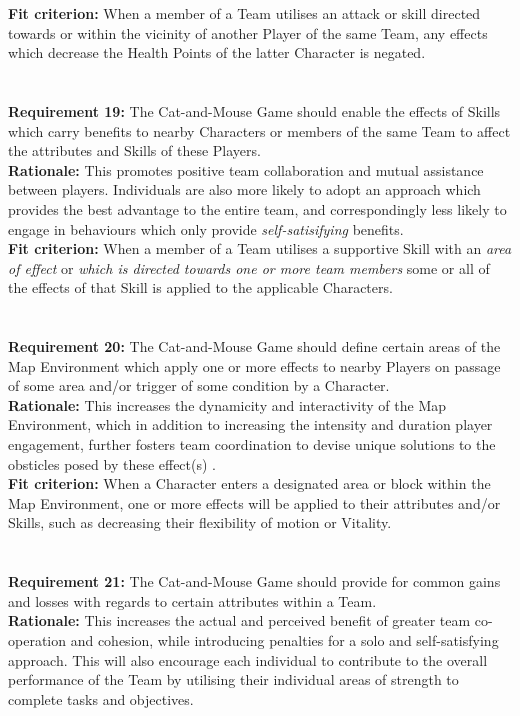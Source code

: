 \documentclass[12pt, titlepage]{article}
\begin{document}
\textbf{Fit criterion:}  When a member of a Team utilises an attack or skill directed towards or within the vicinity of another Player of the same Team, any effects which decrease the Health Points of the latter Character is negated.
\\
\\
\\ \textbf{Requirement 19:}  The Cat-and-Mouse Game should enable the effects of Skills which carry benefits to nearby Characters or members of the same Team to affect the attributes and Skills of these Players.\\
\textbf{Rationale:}  This promotes positive team collaboration and mutual assistance between players. Individuals are also more likely to adopt an approach which provides the best advantage to the entire team, and correspondingly less likely to engage in behaviours which only provide \emph{self-satisifying} benefits.  \\
\textbf{Fit criterion:}  When a member of a Team utilises a supportive Skill with an \emph{area of effect} or \emph{which is directed towards one or more team members} some or all of the effects of that Skill is applied to the applicable Characters.
\\
\\
\\ \textbf{Requirement 20:}  The Cat-and-Mouse Game should define certain areas of the Map Environment which apply one or more effects to nearby Players on passage of some area and/or trigger of some condition by a Character. \\
\textbf{Rationale:}  This increases the dynamicity and interactivity of the Map Environment, which in addition to increasing the intensity and duration player engagement, further fosters team coordination to devise unique solutions to the obsticles posed by these effect(s) .  \\
\textbf{Fit criterion:}  When a Character enters a designated area or block within the Map Environment, one or more effects will be applied to their attributes and/or Skills, such as decreasing their flexibility of motion or Vitality.
\\
\\
\\ \textbf{Requirement 21:}  The Cat-and-Mouse Game should provide for common gains and losses with regards to certain attributes within a Team.  \\
\textbf{Rationale:}  This increases the actual and perceived benefit of greater team co-operation and cohesion, while introducing penalties for a solo and self-satisfying approach. This will also encourage each individual to contribute to the overall performance of the Team by utilising their individual areas of strength to complete tasks and objectives.  \\
\end{document}
